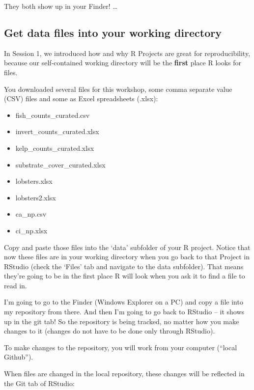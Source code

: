 \documentclass[]{book}
\providecommand{\tightlist}{%
  \setlength{\itemsep}{0pt}\setlength{\parskip}{0pt}}
\begin{document}
They both show up in your Finder! \ldots{}

\hypertarget{get-data-files-into-your-working-directory}{%
\subsection{Get data files into your working directory}\label{get-data-files-into-your-working-directory}}

In Session 1, we introduced how and why R Projects are great for reproducibility, because our self-contained working directory will be the \textbf{first} place R looks for files.

You downloaded several files for this workshop, some comma separate value (CSV) files and some as Excel spreadsheets (.xlsx):

\begin{itemize}
\tightlist
\item
  fish\_counts\_curated.csv
\item
  invert\_counts\_curated.xlsx
\item
  kelp\_counts\_curated.xlsx
\item
  substrate\_cover\_curated.xlsx
\item
  lobsters.xlsx
\item
  lobsters2.xlsx
\item
  ca\_np.csv
\item
  ci\_np.xlsx
\end{itemize}

Copy and paste those files into the `data' subfolder of your R project. Notice that now these files are in your working directory when you go back to that Project in RStudio (check the `Files' tab and navigate to the data subfolder). That means they're going to be in the first place R will look when you ask it to find a file to read in.

I'm going to go to the Finder (Windows Explorer on a PC) and copy a file into my repository from there. And then I'm going to go back to RStudio -- it shows up in the git tab! So the repository is being tracked, no matter how you make changes to it (changes do not have to be done only through RStudio).

To make changes to the repository, you will work from your computer (``local Github'').

When files are changed in the local repository, these changes will be reflected in the Git tab of RStudio:
\end{document}
